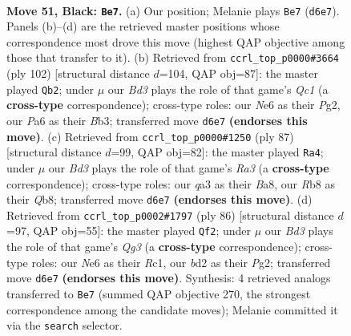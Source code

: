 \documentclass[11pt]{article}
\begin{document}
\clearpage

\begin{figure}[p]\centering
\begin{subfigure}{0.46\textwidth}\centering
\resizebox{\linewidth}{!}{%
\newchessgame
\chessboard[
  setfen={nr6/1q5k/p2bnr2/P1p2p1p/3p1Pp1/QP4P1/1R1BP2P/2RNN1K1 b - - 19 51},
  showmover=false,
  pgfstyle=straightmove, color=movearrow, markmove={d6-e7}
]}
\caption{}
\end{subfigure}\hfill
\begin{subfigure}{0.46\textwidth}\centering
\resizebox{\linewidth}{!}{%
\newchessgame
\chessboard[
  setfen={2r3k1/3rqp2/1pbpn1p1/7p/1PP1Pp1P/1B1R1N2/5PP1/2Q1R1K1 w - - 33 52},
  showmover=false,
  pgfstyle=straightmove, color=movearrow, markmove={c1-b2}
]}
\caption{}
\end{subfigure}
\\[4pt]
\begin{subfigure}{0.46\textwidth}\centering
\resizebox{\linewidth}{!}{%
\newchessgame
\chessboard[
  setfen={bqr3k1/5pp1/rp1ppn1p/8/1PPNPP2/4QB1P/2R3P1/3R3K b - - 34 44},
  showmover=false,
  pgfstyle=straightmove, color=movearrow, markmove={a6-a4}
]}
\caption{}
\end{subfigure}\hfill
\begin{subfigure}{0.46\textwidth}\centering
\resizebox{\linewidth}{!}{%
\newchessgame
\chessboard[
  setfen={1r2r3/p2b1n1k/P1p2qp1/2Pp1p1p/1p3P2/1P1BPNQP/4R1P1/2R4K w - - 17 44},
  showmover=false,
  pgfstyle=straightmove, color=movearrow, markmove={g3-f2}
]}
\caption{}
\end{subfigure}
\caption{\textbf{Move 51, Black: \texttt{Be7}.} (a) Our position; Melanie plays \texttt{Be7} (\texttt{d6e7}). Panels (b)--(d) are the retrieved master positions whose correspondence most drove this move (highest QAP objective among those that transfer to it). (b) Retrieved from \texttt{ccrl\_top\_p0000\#3664} (ply 102) [structural distance $d$=104, QAP obj=87]: the master played \texttt{Qb2}; under $\mu$ our \emph{Bd3} plays the role of that game's \emph{Qc1} (a \textbf{cross-type} correspondence); cross-type roles: our \emph{N}e6 as their \emph{P}g2, our \emph{P}a6 as their \emph{B}b3; transferred move \texttt{d6e7} \textbf{(endorses this move)}. (c) Retrieved from \texttt{ccrl\_top\_p0000\#1250} (ply 87) [structural distance $d$=99, QAP obj=82]: the master played \texttt{Ra4}; under $\mu$ our \emph{Bd3} plays the role of that game's \emph{Ra3} (a \textbf{cross-type} correspondence); cross-type roles: our \emph{q}a3 as their \emph{B}a8, our \emph{R}b8 as their \emph{Q}b8; transferred move \texttt{d6e7} \textbf{(endorses this move)}. (d) Retrieved from \texttt{ccrl\_top\_p0002\#1797} (ply 86) [structural distance $d$=97, QAP obj=55]: the master played \texttt{Qf2}; under $\mu$ our \emph{Bd3} plays the role of that game's \emph{Qg3} (a \textbf{cross-type} correspondence); cross-type roles: our \emph{N}e6 as their \emph{R}c1, our \emph{b}d2 as their \emph{P}g2; transferred move \texttt{d6e7} \textbf{(endorses this move)}. Synthesis: 4 retrieved analogs transferred to \texttt{Be7} (summed QAP objective 270, the strongest correspondence among the candidate moves); Melanie committed it via the \texttt{search} selector.}
\label{fig:thought-m101}
\end{figure}
\end{document}

